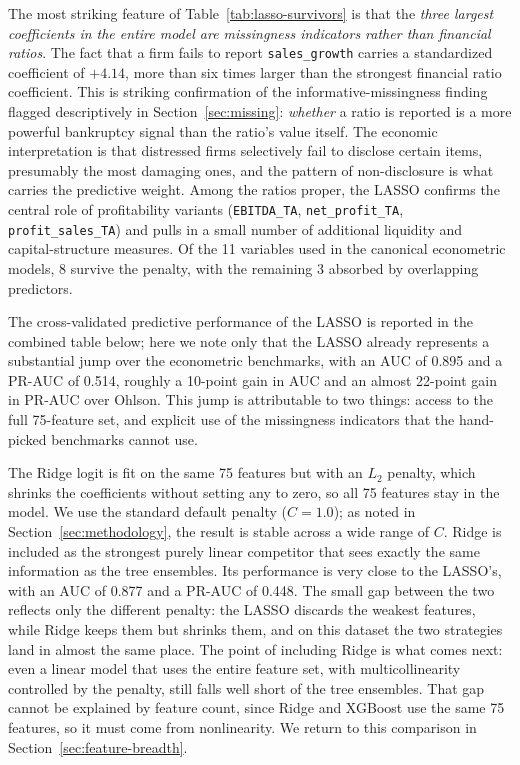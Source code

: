 \documentclass[12pt,a4paper]{article}
\begin{document}
The most striking feature of Table~\ref{tab:lasso-survivors} is that the
\emph{three largest coefficients in the entire model are missingness
indicators rather than financial ratios}. The fact that a firm fails to
report \texttt{sales\_growth} carries a standardized coefficient of $+4.14$,
more than six times larger than the strongest financial ratio coefficient.
This is striking confirmation of the informative-missingness finding
flagged descriptively in Section~\ref{sec:missing}: \emph{whether} a
ratio is reported is a more powerful bankruptcy signal than the
ratio's value itself. The economic interpretation is that distressed firms
selectively fail to disclose certain items, presumably the most damaging
ones, and the pattern of non-disclosure is what carries the predictive
weight. Among the ratios proper, the LASSO confirms the central role of
profitability variants (\texttt{EBITDA\_TA}, \texttt{net\_profit\_TA},
\texttt{profit\_sales\_TA}) and pulls in a small number of additional
liquidity and capital-structure measures. Of the 11 variables used in the
canonical econometric models, 8 survive the penalty, with the remaining 3
absorbed by overlapping predictors.

The cross-validated predictive performance of the LASSO is reported in the
combined table below; here we note only that the LASSO already represents a
substantial jump over the econometric benchmarks, with an AUC of 0.895 and a
PR-AUC of 0.514, roughly a 10-point gain in AUC and an almost 22-point gain
in PR-AUC over Ohlson. This jump is attributable to two things: access to the
full 75-feature set, and explicit use of the missingness indicators that the
hand-picked benchmarks cannot use.

The Ridge logit is fit on the same 75 features but with an $L_2$ penalty,
which shrinks the coefficients without setting any to zero, so all 75 features
stay in the model. We use the standard default penalty ($C = 1.0$); as noted
in Section~\ref{sec:methodology}, the result is stable across a wide range of
$C$. Ridge is included as the strongest purely linear competitor that sees
exactly the same information as the tree ensembles. Its performance is very
close to the LASSO's, with an AUC of 0.877 and a PR-AUC of 0.448. The small
gap between the two reflects only the different penalty: the LASSO discards
the weakest features, while Ridge keeps them but shrinks them, and on this
dataset the two strategies land in almost the same place. The point of
including Ridge is what comes next: even a linear model that uses the entire
feature set, with multicollinearity controlled by the penalty, still falls
well short of the tree ensembles. That gap cannot be explained by feature
count, since Ridge and XGBoost use the same 75 features, so it must come from
nonlinearity. We return to this comparison in Section~\ref{sec:feature-breadth}.
\end{document}
